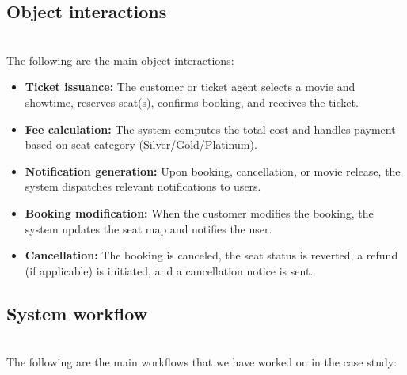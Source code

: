 \subsection{Object interactions}\label{Eca7kOiWLIEqIFcnUzPQN}
\\
The following are the main object interactions:

\begin{itemize}
\item
\protect{}\label{GCpiAiIfsmPX4oo-A5yG7}
\textbf{Ticket issuance:} The customer or ticket agent selects a movie and showtime, reserves seat(s), confirms booking, and receives the ticket.
\item
\protect{}\label{UqUFjPN4I0uojVsxRZpfB}
\textbf{Fee calculation:} The system computes the total cost and handles payment based on seat category (Silver/Gold/Platinum).
\item
\protect{}\label{KCM0zVb7muc0yNNNst_sK}
\textbf{Notification generation:} Upon booking, cancellation, or movie release, the system dispatches relevant notifications to users.
\item
\protect{}\label{50U1n7Nfqfd1RRCu91jpN}
\textbf{Booking modification:} When the customer modifies the booking, the system updates the seat map and notifies the user.
\item
\protect{}\label{Y8ZmmTBx9dbZmTkJEz_-i}
\textbf{Cancellation:} The booking is canceled, the seat status is reverted, a refund (if applicable) is initiated, and a cancellation notice is sent.
\end{itemize}

\subsection{System workflow}\label{d9WokN-h28v0YUL9_ChOy}
\\
The following are the main workflows that we have worked on in the case study:

